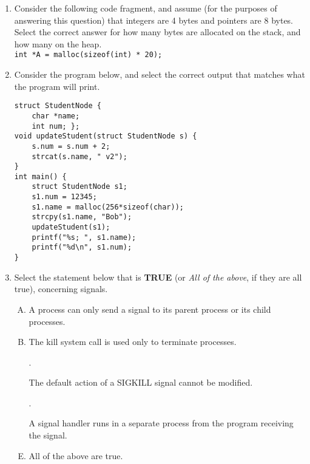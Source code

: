 \documentclass[11pt]{article}
\begin{document}
\begin{enumerate}[{1}.1]
	\newpage
	\item Consider the following code fragment, and assume (for the purposes of answering this question) that integers are 4 bytes and pointers are 8 bytes. Select the correct answer for how many bytes are allocated on the stack, and how many on the heap.\\
	\Verb|int *A = malloc(sizeof(int) * 20);|

	\item Consider the program below, and select the correct output that matches what the program
	will print.
	\begin{Verbatim}
struct StudentNode {
	char *name;
	int num; };
void updateStudent(struct StudentNode s) {
	s.num = s.num + 2;
	strcat(s.name, " v2");
}
int main() {
	struct StudentNode s1;
	s1.num = 12345;
	s1.name = malloc(256*sizeof(char));
	strcpy(s1.name, "Bob");
	updateStudent(s1);
	printf("%s; ", s1.name);
	printf("%d\n", s1.num);
}
	\end{Verbatim}

	\item Select the statement below that is \textbf{TRUE} (or \textit{All of the above}, if they are all true), concerning signals.
		\begin{enumerate}[A.]
			\item A process can only send a signal to its parent process or its child processes.
			\item The kill system call is used only to terminate processes.
			\item[\textcolor{correct}{\addtocounter{enumii}{1}\Alph{enumii}.}] \textcolor{correct}{The default action of a SIGKILL signal cannot be modified.}
			\item[\textcolor{correct}{\addtocounter{enumii}{1}\Alph{enumii}.}] \textcolor{correct}{A signal handler runs in a separate process from the program receiving the signal.}
			\item All of the above are true.
		\end{enumerate}


\end{enumerate}
\end{document}
